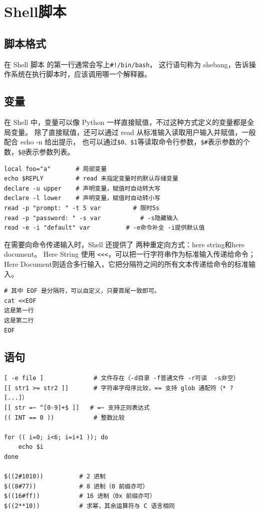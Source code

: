 \section{Shell脚本}
\subsection{脚本格式}
在 Shell 脚本 的第一行通常会写上\verb|#!/bin/bash|，
这行语句称为 shebang，告诉操作系统在执行脚本时，应该调用哪一个解释器。

\subsection{变量}
在 Shell 中，变量可以像 Python 一样直接赋值，不过这种方式定义的变量都是全局变量。
除了直接赋值，还可以通过 read 从标准输入读取用户输入并赋值，一般配合 echo -n 给出提示，
也可以通过\verb|$0、$1|等读取命令行参数，\verb|$#|表示参数的个数，\verb|$@|表示参数列表。

\begin{code}[title=变量]
	\begin{verbatim}
local foo="a"       # 局部变量
echo $REPLY         # read 未指定变量时的默认存储变量
declare -u upper    # 声明变量，赋值时自动转大写
declare -l lower    # 声明变量，赋值时自动转小写
read -p "prompt: " -t 5 var         # 限时5s
read -p "password: " -s var           # -s隐藏输入
read -e -i "default" var          # -e命令补全 -i提供默认值
	\end{verbatim}
\end{code}

在需要向命令传递输入时，Shell 还提供了 两种重定向方式：here string和here document。
Here String 使用 \verb|<<<|，可以把一行字符串作为标准输入传递给命令；
Here Document则适合多行输入，它把分隔符之间的所有文本传递给命令的标准输入。
\begin{code}[title=Here Document]
	\begin{verbatim}
# 其中 EOF 是分隔符，可以自定义，只要首尾一致即可。
cat <<EOF
这是第一行
这是第二行
EOF
	\end{verbatim}
\end{code}

\subsection{语句}
\begin{code}[title=语句]
	\begin{verbatim}
[ -e file ]              # 文件存在（-d目录 -f普通文件 -r可读  -s非空）
[[ str1 >= str2 ]]       # 字符串字母序比较，== 支持 glob 通配符（* ? [...]）
[[ str =~ ^[0-9]+$ ]]   # =~ 支持正则表达式
(( INT == 0 ))           # 整数比较

for (( i=0; i<6; i=i+1 )); do
    echo $i
done

$((2#1010))          # 2 进制
$((8#77))            # 8 进制（0 前缀亦可）
$((16#ff))           # 16 进制（0x 前缀亦可）
$((2**10))           # 求幂，其余运算符与 C 语言相同
	\end{verbatim}
\end{code}

